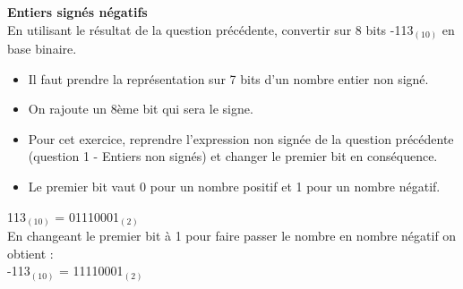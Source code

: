 \begin{Exercice}[5 minutes] \textbf{Entiers signés négatifs}\\
    En utilisant le résultat de la question précédente, convertir sur 8 bits -113$_{(10)}$ en base binaire. \\

    \begin{conseil}
        \begin{itemize}
        	\item Il faut prendre la représentation sur 7 bits d'un nombre entier non signé.
        	\item On rajoute un 8ème bit qui sera le signe.
        	\item Pour cet exercice, reprendre l'expression non signée de la question précédente (question 1 - Entiers non signés) et changer le premier bit en conséquence.
        	\item Le premier bit vaut 0 pour un nombre positif et 1 pour un nombre négatif.
        \end{itemize} 
    \end{conseil}
    
    \begin{solution}
         113$_{(10)}$ = 01110001$_{(2)}$ \\
         
         En changeant le premier bit à 1 pour faire passer le nombre en nombre négatif on obtient : \\
         
         -113$_{(10)}$ = 11110001$_{(2)}$ \\
    \end{solution}
\end{Exercice}

